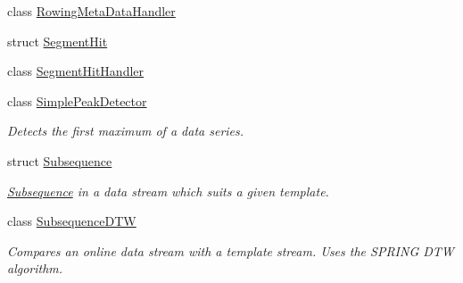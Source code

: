 \begin{DoxyCompactItemize}
class \hyperlink{class_rowing_monitor_1_1_model_1_1_util_1_1_rowing_meta_data_handler}{Rowing\+Meta\+Data\+Handler}
\item 
struct \hyperlink{struct_rowing_monitor_1_1_model_1_1_util_1_1_segment_hit}{Segment\+Hit}
\item 
class \hyperlink{class_rowing_monitor_1_1_model_1_1_util_1_1_segment_hit_handler}{Segment\+Hit\+Handler}
\item 
class \hyperlink{class_rowing_monitor_1_1_model_1_1_util_1_1_simple_peak_detector}{Simple\+Peak\+Detector}
\begin{DoxyCompactList}\small\item\em Detects the first maximum of a data series. \end{DoxyCompactList}\item 
struct \hyperlink{struct_rowing_monitor_1_1_model_1_1_util_1_1_subsequence}{Subsequence}
\begin{DoxyCompactList}\small\item\em \hyperlink{struct_rowing_monitor_1_1_model_1_1_util_1_1_subsequence}{Subsequence} in a data stream which suits a given template. \end{DoxyCompactList}\item 
class \hyperlink{class_rowing_monitor_1_1_model_1_1_util_1_1_subsequence_d_t_w}{Subsequence\+D\+TW}
\begin{DoxyCompactList}\small\item\em Compares an online data stream with a template stream. Uses the S\+P\+R\+I\+NG D\+TW algorithm. \end{DoxyCompactList}\end{DoxyCompactItemize}

